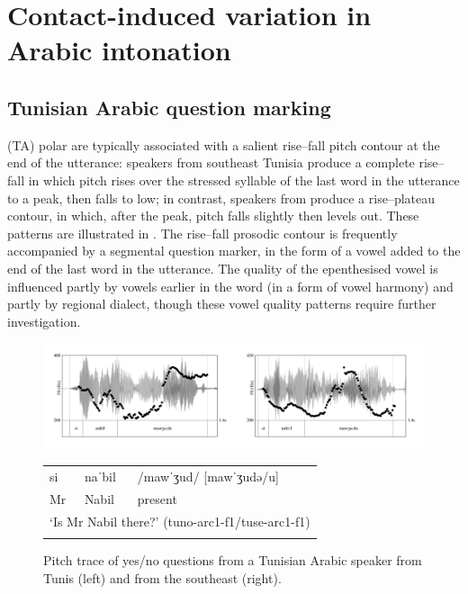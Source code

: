 \documentclass[output=paper]{langsci/langscibook}
\begin{document}
 \section{Contact-induced variation in Arabic intonation} \label{araint}


 \subsection{Tunisian Arabic question marking} \label{tunis}


  (TA) polar  are typically associated with a salient rise--fall pitch contour at the end of the utterance: speakers from southeast Tunisia produce a complete rise--fall in which pitch rises over the stressed syllable of the last word in the utterance to a peak, then falls to low; in contrast, speakers from  produce a rise--plateau contour, in which, after the peak, pitch falls slightly then levels out. These patterns are illustrated in  \citep{BouchhiouaHellmuthAlmbark2019}. The rise--fall prosodic contour is frequently accompanied by a segmental question marker, in the form of a vowel added to the end of the last word in the utterance. The quality of the epenthesised vowel is influenced partly by vowels earlier in the word (in a form of vowel harmony) and partly by regional dialect, though these vowel quality patterns require further investigation.

  
\begin{figure}
\includegraphics[width=\textwidth]{figures/intonation-img1.png}
\caption{\label{fig:key:1}Pitch trace of yes/no questions from a Tunisian Arabic speaker from Tunis (left) and from the southeast (right).}

\begin{tabularx}{\textwidth}{llX}
\lsptoprule
si & naˈbil & /mawˈʒud/ [mawˈʒudə/u]\\
Mr & Nabil & present\\
\multicolumn{3}{l}{‘Is Mr Nabil there?’  (tuno-arc1-f1/tuse-arc1-f1)}\\
\lspbottomrule
\end{tabularx}
\end{figure}
\end{document}
